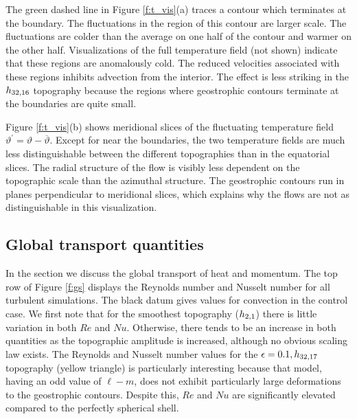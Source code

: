 The green dashed line in Figure \ref{f:t_vis}(a) traces a contour which terminates at the boundary. The fluctuations in the region of this contour are larger scale. 
The fluctuations are colder than the average on one half of the contour and warmer on the other half.
Visualizations of the full temperature field (not shown) indicate that these regions are anomalously cold. 
The reduced velocities associated with these regions inhibits advection from the interior. The effect is less striking in the $h_{32,16}$ topography because the regions where geostrophic contours terminate at the boundaries are quite small.

Figure \ref{f:t_vis}(b) shows meridional slices of the fluctuating temperature field $\vartheta^{\prime} = \vartheta -\overline{\vartheta}$.
Except for near the boundaries, the two temperature fields are much less distinguishable between the different topographies than in the equatorial slices. 
The radial structure of the flow is visibly less dependent on the topographic scale than the azimuthal structure. 
The geostrophic contours run in planes perpendicular to meridional slices, which explains why the flows are not as distinguishable in this visualization.




\subsection{Global transport quantities}
\label{s:gs}
In the section we discuss the global transport of heat and momentum.
The top row of Figure \ref{f:gs} displays the Reynolds number and Nusselt number for all turbulent simulations.
The black datum gives values for convection in the control case. 
We first note that for the smoothest topography ($h_{2,1}$) there is little variation in both $Re$ and $Nu$. Otherwise, there tends to be an increase in both quantities as the topographic amplitude is increased, although no obvious scaling law exists. 
The Reynolds and Nusselt number values for the $\epsilon  = 0.1, h_{32,17}$ topography (yellow triangle) is particularly interesting because that model, having an odd value of $\ell-m$, does not exhibit particularly large deformations to the geostrophic contours. Despite this, $Re$ and $Nu$ are significantly elevated compared to the perfectly spherical shell.



